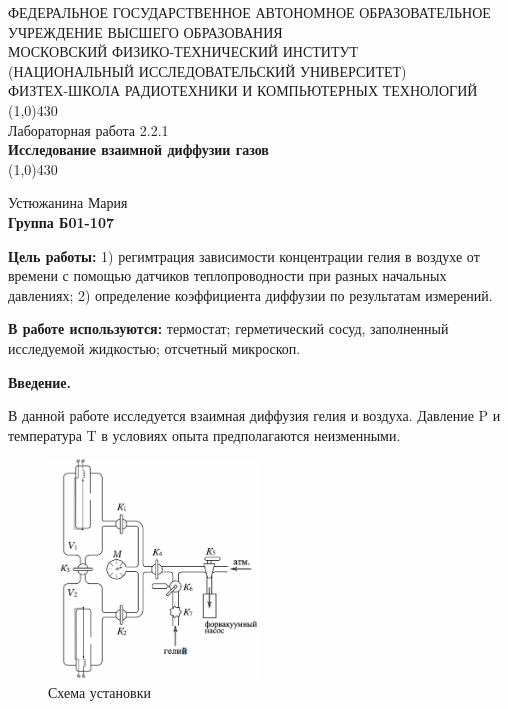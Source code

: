 \documentclass[11pt]{article}
\begin{document}
\begin{titlepage}
\begin{center}
\large{\small ФЕДЕРАЛЬНОЕ ГОСУДАРСТВЕННОЕ АВТОНОМНОЕ ОБРАЗОВАТЕЛЬНОЕ\\ УЧРЕЖДЕНИЕ ВЫСШЕГО ОБРАЗОВАНИЯ\\ МОСКОВСКИЙ ФИЗИКО-ТЕХНИЧЕСКИЙ ИНСТИТУТ\\ (НАЦИОНАЛЬНЫЙ ИССЛЕДОВАТЕЛЬСКИЙ УНИВЕРСИТЕТ)\\ ФИЗТЕХ-ШКОЛА РАДИОТЕХНИКИ И КОМПЬЮТЕРНЫХ ТЕХНОЛОГИЙ}
\vfill
\line(1,0){430}\\[1mm]
\huge{Лабораторная работа 2.2.1}\\
\huge\textbf{Исследование взаимной диффузии газов}\\
\line(1,0){430}\\[1mm]
\vfill
\begin{flushright}
\normalsize{Устюжанина Мария}\\
\normalsize{\textbf{Группа Б01-107}}\\
\end{flushright}
\end{center}
\end{titlepage}

\par \textbf{Цель работы:} 1) регимтрация зависимости концентрации гелия в воздухе от времени с помощью датчиков теплопроводности при разных начальных давлениях; 2) определение коэффициента диффузии по результатам измерений.
\par \textbf{В работе используются:} термостат; герметический сосуд, заполненный исследуемой жидкостью; отсчетный микроскоп.

\par \textbf{Введение.}

В данной работе исследуется взаимная диффузия гелия и воздуха. Давление P и температура T в условиях опыта предполагаются неизменными.

\begin{figure}[H]
\centering
\captionsetup{justification=centering}
\includegraphics[width=0.5\textwidth]{pic1.png}
\caption{Схема установки}
\end{figure}
\end{document}
